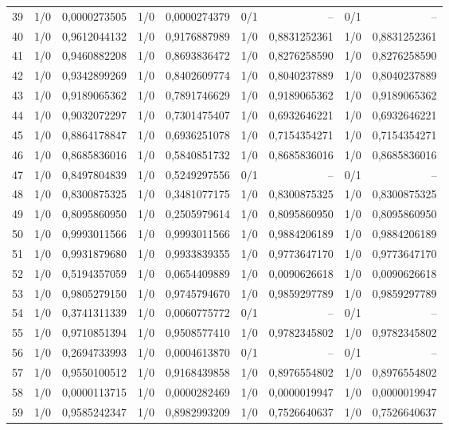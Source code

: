 \begin{longtable}{lrrrrrrrr}
39 & 1/0 & 0,0000273505 & 1/0 & 0,0000274379 & 0/1 & -- & 0/1 & -- \\
40 & 1/0 & 0,9612044132 & 1/0 & 0,9176887989 & 1/0 & 0,8831252361 & 1/0 & 0,8831252361 \\
41 & 1/0 & 0,9460882208 & 1/0 & 0,8693836472 & 1/0 & 0,8276258590 & 1/0 & 0,8276258590 \\
42 & 1/0 & 0,9342899269 & 1/0 & 0,8402609774 & 1/0 & 0,8040237889 & 1/0 & 0,8040237889 \\
43 & 1/0 & 0,9189065362 & 1/0 & 0,7891746629 & 1/0 & 0,9189065362 & 1/0 & 0,9189065362 \\
44 & 1/0 & 0,9032072297 & 1/0 & 0,7301475407 & 1/0 & 0,6932646221 & 1/0 & 0,6932646221 \\
45 & 1/0 & 0,8864178847 & 1/0 & 0,6936251078 & 1/0 & 0,7154354271 & 1/0 & 0,7154354271 \\
46 & 1/0 & 0,8685836016 & 1/0 & 0,5840851732 & 1/0 & 0,8685836016 & 1/0 & 0,8685836016 \\
47 & 1/0 & 0,8497804839 & 1/0 & 0,5249297556 & 0/1 & -- & 0/1 & -- \\
48 & 1/0 & 0,8300875325 & 1/0 & 0,3481077175 & 1/0 & 0,8300875325 & 1/0 & 0,8300875325 \\
49 & 1/0 & 0,8095860950 & 1/0 & 0,2505979614 & 1/0 & 0,8095860950 & 1/0 & 0,8095860950 \\
50 & 1/0 & 0,9993011566 & 1/0 & 0,9993011566 & 1/0 & 0,9884206189 & 1/0 & 0,9884206189 \\
51 & 1/0 & 0,9931879680 & 1/0 & 0,9933839355 & 1/0 & 0,9773647170 & 1/0 & 0,9773647170 \\
52 & 1/0 & 0,5194357059 & 1/0 & 0,0654409889 & 1/0 & 0,0090626618 & 1/0 & 0,0090626618 \\
53 & 1/0 & 0,9805279150 & 1/0 & 0,9745794670 & 1/0 & 0,9859297789 & 1/0 & 0,9859297789 \\
54 & 1/0 & 0,3741311339 & 1/0 & 0,0060775772 & 0/1 & -- & 0/1 & -- \\
55 & 1/0 & 0,9710851394 & 1/0 & 0,9508577410 & 1/0 & 0,9782345802 & 1/0 & 0,9782345802 \\
56 & 1/0 & 0,2694733993 & 1/0 & 0,0004613870 & 0/1 & -- & 0/1 & -- \\
57 & 1/0 & 0,9550100512 & 1/0 & 0,9168439858 & 1/0 & 0,8976554802 & 1/0 & 0,8976554802 \\
58 & 1/0 & 0,0000113715 & 1/0 & 0,0000282469 & 1/0 & 0,0000019947 & 1/0 & 0,0000019947 \\
59 & 1/0 & 0,9585242347 & 1/0 & 0,8982993209 & 1/0 & 0,7526640637 & 1/0 & 0,7526640637 \\

\end{longtable}
